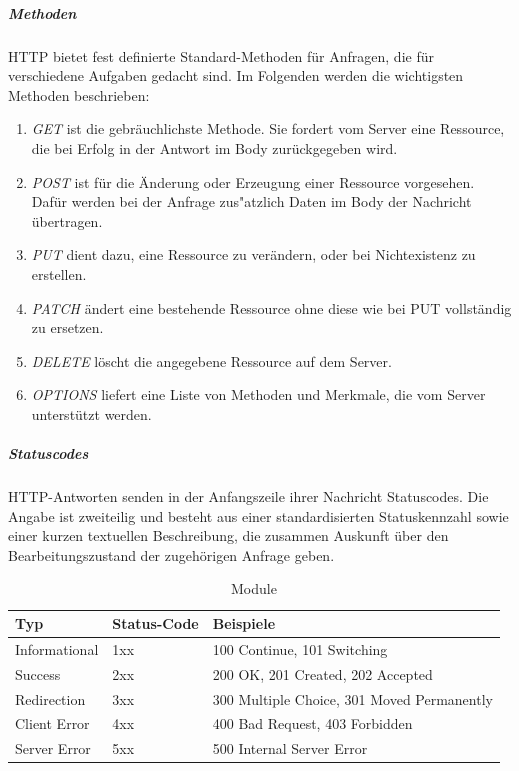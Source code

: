 \noindent
\subparagraph{Methoden}
HTTP bietet fest definierte Standard-Methoden für Anfragen, die für verschiedene Aufgaben gedacht sind. Im Folgenden werden die wichtigsten Methoden beschrieben:

\begin{enumerate}
		\item \textit{GET} ist die gebräuchlichste Methode. Sie fordert vom Server eine Ressource, die bei Erfolg in der Antwort im Body zurückgegeben wird. 
		
		\item \textit{POST} ist für die Änderung oder Erzeugung einer Ressource vorgesehen. Dafür werden bei der Anfrage zus"atzlich Daten im Body der Nachricht übertragen.
		
		\item \textit{PUT} dient dazu, eine Ressource zu verändern, oder bei Nichtexistenz zu erstellen.
	
		\item \textit{PATCH} ändert eine bestehende Ressource ohne diese wie bei PUT vollständig zu ersetzen. 
		
		\item \textit{DELETE} löscht die angegebene Ressource auf dem Server.
		
		\item \textit{OPTIONS} liefert eine Liste von Methoden und Merkmale, die vom Server unterstützt werden.
		
\end{enumerate}
\newpage
\noindent
\subparagraph{Statuscodes}
HTTP-Antworten senden in der Anfangszeile ihrer Nachricht Statuscodes. Die Angabe ist zweiteilig und besteht aus einer standardisierten Statuskennzahl sowie einer kurzen textuellen Beschreibung, die zusammen Auskunft über den Bearbeitungszustand der zugehörigen Anfrage geben.\newline

\begin{table}[h]
\begin{center}
    \begin{tabular}{| l | l |  p{8cm} |}
    \hline
    Typ & Status-Code & Beispiele \\ \hline
    
    Informational & 1xx & 100 Continue, 101 Switching\\
    
    \hline
    Success & 2xx & 200 OK, 201 Created, 202 Accepted  \\
    
    \hline
	Redirection & 3xx & 300 Multiple Choice, 301 Moved Permanently  \\
	
    \hline    
    Client Error & 4xx & 400 Bad Request, 403 Forbidden\\ 
    
    \hline    
    Server Error & 5xx & 500 Internal Server Error \\
    \hline
    \end{tabular}
\end{center}
\caption{Module}
\end{table}

